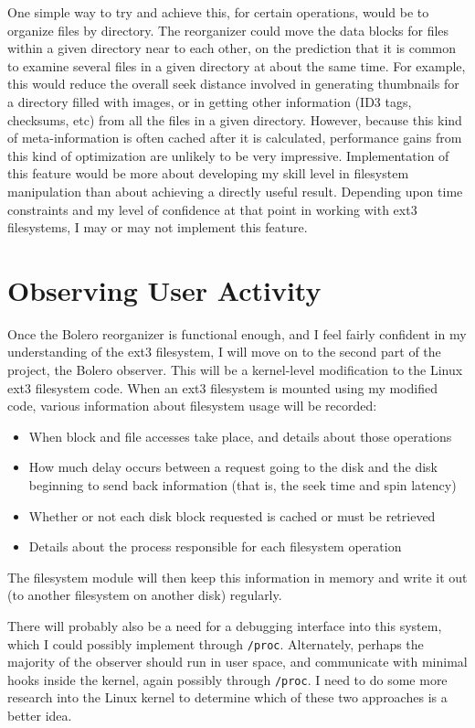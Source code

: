 \documentclass[10pt]{article}
\begin{document}
One simple way to try and achieve this, for certain operations, would be to organize files by directory.
The reorganizer could move the data blocks for files within a given directory near to each other,
on the prediction that it is common to examine several files in a given
directory at about the same time. For example, this would reduce the overall seek distance
involved in generating thumbnails for a directory filled with images, or in
getting other information (ID3 tags, checksums, etc) from all the files in a
given directory. However, because this kind of meta-information is often
cached after it is calculated, performance gains from this kind of
optimization are unlikely to be very impressive. Implementation of this
feature would be more about developing my skill level in filesystem manipulation
than about achieving a directly useful result.
Depending upon time constraints and my level of confidence at that point in
working with ext3 filesystems, I may or may not implement this feature.

\section{Observing User Activity}

Once the Bolero reorganizer is functional enough, and I feel fairly confident in
my understanding of the ext3 filesystem, I will move on to the second part of
the project, the Bolero observer. This will be a kernel-level modification
to the Linux ext3 filesystem code. When an ext3 filesystem is mounted using
my modified code, various information about filesystem usage will be recorded:
\begin{itemize}
\item When block and file accesses take place, and details about those operations
\item How much delay occurs between a request going to the disk and the disk
beginning to send back information (that is, the seek time and spin latency)
\item Whether or not each disk block requested is cached or must be retrieved
\item Details about the process responsible for each filesystem operation
\end{itemize}
The filesystem module will then keep this information in memory and write it out
(to another filesystem on another disk) regularly.

There will probably also be a need for a debugging interface into this system,
which I could possibly implement through \texttt{/proc}. Alternately, perhaps the
majority of the observer should run in user space, and
communicate with minimal hooks inside the kernel, again possibly through \texttt{/proc}.
I need to do some more research into the Linux kernel to determine which of
these two approaches is a better idea.
\end{document}
